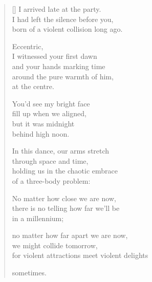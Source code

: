 \documentclass[12pt,a4paper]{article}
\begin{document}
\thispagestyle{empty}


\settowidth{\versewidth}{for violent attractions meet violent delights}

\bigskip

\begin{verse}[\versewidth]
  I arrived late at the party. \\
  I had left the silence before you, \\
  born of a violent collision long ago.

  Eccentric, \\
  I witnessed your first dawn \\
  and your hands marking time \\
  around the pure warmth of him, \\
  at the centre.

  You'd see my bright face \\
  fill up when we aligned, \\
  but it was midnight \\
  behind high noon.

  In this dance, our arms stretch \\
  through space and time, \\
  holding us in the chaotic embrace \\
  of a three-body problem:

  No matter how close we are now, \\
  there is no telling how far we'll be \\
  in a millennium;

  no matter how far apart we are now, \\
  we might collide tomorrow, \\
  for violent attractions meet violent delights

  sometimes.
\end{verse}
\end{document}
